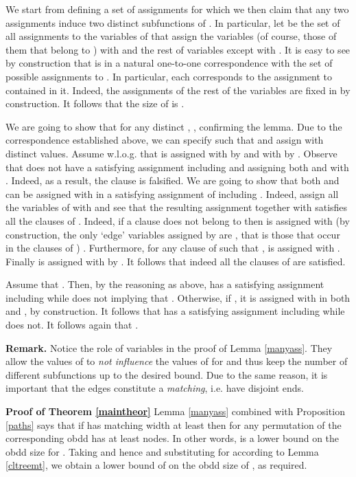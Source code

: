 \documentclass{article}
\begin{document}
We start from defining a set of  assignments for which we then claim that any two assignments
induce two distinct subfunctions of .
In particular, let  be the set of all assignments
to the variables of  that assign the variables   (of course,
those of them that belong to ) with 
and the rest of variables except  with . 
It is easy to see by construction that  is in a natural one-to-one correspondence
with the set of possible assignments to . In particular,
each  corresponds to the assignment  to 
contained in it. Indeed, the assignments of the rest of the variables are fixed
in  by construction. It follows that the size of  is .


We are going to show that for any distinct , ,
confirming the lemma. Due to the correspondence established above, we can specify  such that
 and  assign  with distinct values. Assume w.l.o.g. that 
 is assigned with  by  and with  by . 
Observe that  does not have a satisfying assignment including  and 
assigning both  and  with . Indeed, as a result, 
the clause  is falsified. 
We are going to show that both  and  can be assigned 
with  in a satisfying assignment of  including .
Indeed, assign all the variables of  with  and see that the resulting 
assignment together with  satisfies all the clauses of .
Indeed, if a clause 
does not belong to  then  is assigned with  
(by construction, the only `edge' variables assigned by  are , that is 
those that occur in the clauses of ) . Furthermore, for any clause
 of  such that ,  is assigned with
. Finally  is assigned with  by . It follows that indeed all the clauses of  are satisfied. 

Assume that . Then, by the reasoning as above,  has a satisfying assignment 
including  while  does not implying that .
Otherwise, if , it is assigned with  in both  and , by construction.
It follows that  has a satisfying assignment including  while  does not. It follows 
again that .


{\bf Remark.} Notice the role of variables  in the proof of Lemma \ref{manyass}.
They allow the values of  to \emph{not influence} the values of  for 
and thus keep the number of different subfunctions up to the desired bound. Due to the same reason, it
is important that the edges  constitute a \emph{matching}, i.e. have disjoint
ends. 

{\bf Proof of Theorem \ref{maintheor}}
Lemma \ref{manyass} combined with Proposition \ref{paths}
says that if  has matching width at least  then 
for any permutation of  the corresponding {\sc obdd}
has at least  nodes. In other words,  is a lower bound
on the {\sc obdd} size for . Taking 
and hence  and substituting  for  according 
to Lemma \ref{cltreemt}, we obtain a lower bound of  on the
{\sc obdd} size of , as required.  
\end{document}
